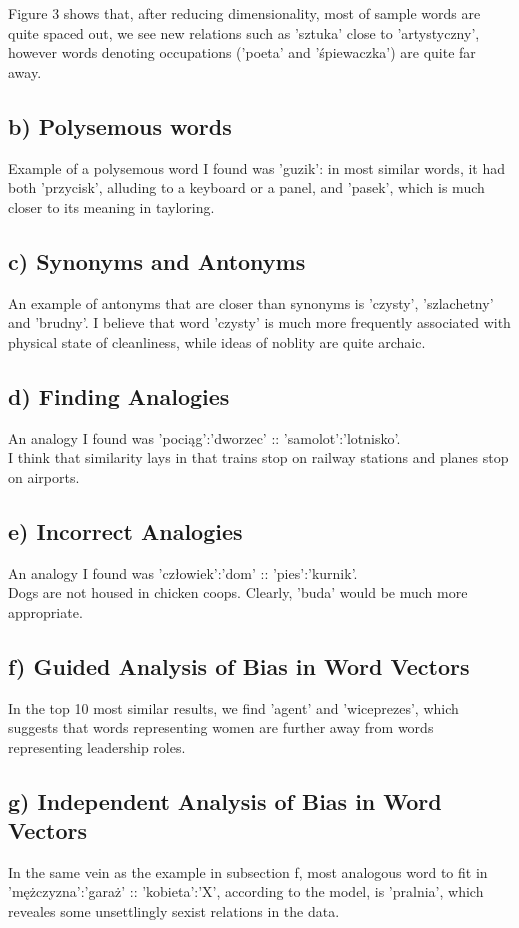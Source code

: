 \documentclass[12pt]{article}
\begin{document}
Figure 3 shows that, after reducing dimensionality, most of sample words are 
quite spaced out, we see new relations such as 'sztuka' close to 'artystyczny', 
however words denoting occupations ('poeta' and 'śpiewaczka') are quite far away.

\subsection*{b) Polysemous words}
Example of a polysemous word I found was 'guzik': in most similar words, it had 
both 'przycisk', alluding to a keyboard or a panel, and 'pasek', which is much 
closer to its meaning in tayloring.

\subsection*{c) Synonyms and Antonyms}
An example of antonyms that are closer than synonyms is 'czysty', 'szlachetny' 
and 'brudny'. I believe that word 'czysty' is much more frequently associated 
with physical state of cleanliness, while ideas of noblity are quite archaic.

\subsection*{d) Finding Analogies}
An analogy I found was 'pociąg':'dworzec' :: 'samolot':'lotnisko'. \\
I think that similarity lays in that trains stop on railway stations and planes 
stop on airports.

\subsection*{e) Incorrect Analogies}
An analogy I found was 'człowiek':'dom' :: 'pies':'kurnik'. \\
Dogs are not housed in chicken coops. Clearly, 'buda' would be much more appropriate.

\subsection*{f) Guided Analysis of Bias in Word Vectors}
In the top 10 most similar results, we find 'agent' and 'wiceprezes', which 
suggests that words representing women are further away from words representing 
leadership roles.

\subsection*{g) Independent Analysis of Bias in Word Vectors}
In the same vein as the example in subsection f, most analogous word to fit in 
'mężczyzna':'garaż' :: 'kobieta':'X', according to the model, is 'pralnia', 
which reveales some unsettlingly sexist relations in the data.
\end{document}
